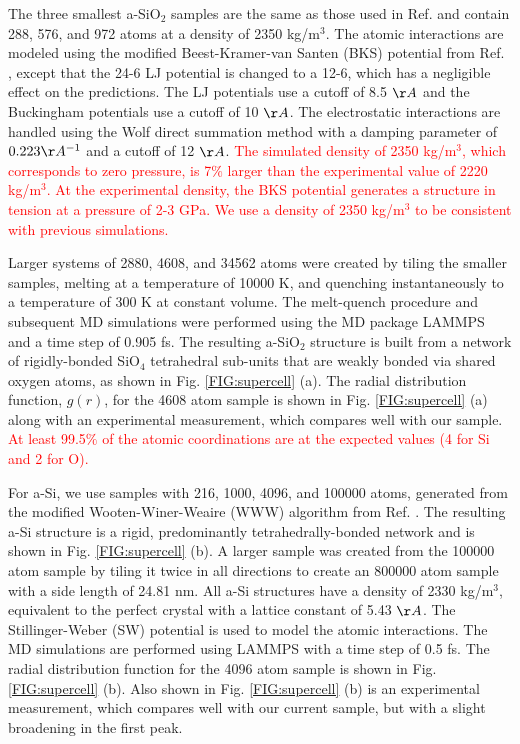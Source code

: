 \documentclass[aps,prb,twocolumn,superscriptaddress,footinbib,amsmath,amssymb,floatfix]{revtex4}
\begin{document}
The three smallest a-SiO$_2$ samples are the same as those used 
in Ref.  
and contain 288, 576, and 972 atoms at a density of 2350 kg/m$^3$.  
The atomic interactions are modeled using 
the modified Beest-Kramer-van Santen (BKS) potential
\cite{van_Beest_force_1990,kramer_interatomic_1991}
from Ref. 
, except that the 24-6 
LJ potential\cite{guissani_numerical_1996} 
is changed to a 12-6, 
which has a negligible effect on the predictions.  
The LJ potentials use a cutoff of 8.5 $\AA$ and the Buckingham 
potentials use a cutoff of 10 $\AA$. 
The electrostatic interactions are handled using the Wolf direct 
summation method with 
a damping parameter of $0.223 \AA^{-1}$ and a cutoff 
of 12 $\AA$.\cite{wolf_exact_1999} 
\textcolor{red}{
The simulated density of 2350 kg/m$^3$, which corresponds 
to zero pressure, is 7$\%$ larger than the experimental 
value of 2220 kg/m$^3$.
\cite{kaviany_principles_2001} At the experimental 
density, the BKS potential generates a structure in 
tension at a pressure of 2-3 GPa.\cite{mcgaughey_thermal_2004} 
We use a density of 2350 kg/m$^3$ to be consistent 
with previous simulations.
}

Larger systems of 2880, 4608, and 34562 atoms were created by 
tiling the smaller samples, melting at a temperature of 10000 K,  
and quenching instantaneously to a temperature of 300 K at 
constant volume. 
The melt-quench procedure and subsequent MD simulations were 
performed using the MD package 
LAMMPS and a time step of 0.905 fs.\cite{plimpton_fast_1995} 
The resulting a-SiO$_2$ structure is built from a network 
of rigidly-bonded SiO$_4$ tetrahedral sub-units that are weakly 
bonded via shared oxygen atoms, 
as shown in Fig. \ref{FIG:supercell} (a). 
The radial distribution function, 
$g(r)$, for the 4608 atom 
sample is shown in Fig. \ref{FIG:supercell} (a) along with an 
experimental measurement,\cite{lorch_neutron_1969} which 
compares well with our sample. 
\textcolor{red}{
At least 99.5$\%$ of the atomic coordinations are at the  
expected values (4 for Si and 2 for O).\cite{mcgaughey_thermal_2004}
}

For a-Si, we use samples 
with 216, 1000, 4096, and 100000 atoms, generated from the 
modified Wooten-Winer-Weaire (WWW) algorithm 
from Ref. . 
The resulting a-Si structure is a rigid, predominantly 
tetrahedrally-bonded network and is shown in 
Fig. \ref{FIG:supercell} (b).  
A larger sample was created from the 100000 atom sample 
by tiling it twice in all directions to create an 
800000 atom sample with a side length of 24.81 nm.  
All a-Si structures have a density of 2330 kg/m$^3$, 
equivalent to the perfect 
crystal with a lattice constant of 5.43 $\AA$. 
The Stillinger-Weber (SW) potential is used to model the atomic 
interactions.\cite{stillinger_computer_1985} The MD simulations 
are performed using LAMMPS with a time step of 0.5 fs. 
The radial distribution function for the 4096 atom 
sample is shown in Fig. \ref{FIG:supercell} (b). 
Also shown in Fig. \ref{FIG:supercell} (b) is an experimental 
measurement,\cite{laaziri_high-energy_1999} 
which compares well with our current sample, but with a slight 
broadening in the first peak.
\end{document}
